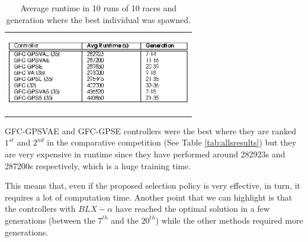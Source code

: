 \documentclass[10pt,journal,compsoc]{IEEEtran}
\begin{document}
\begin{table}[!ht]
	\centering
	{\scriptsize
          \caption{Average runtime in 10 runs of 10 races 
            and
                  generation where the best individual was spawned.}
		\label{tab:time}
				\begin{tabular}{c}
			\includegraphics[width=8cm, height=3.5cm, clip=true, trim=0cm 0cm 0cm 0cm]{fig/table5.eps} 
%					
		
		\end{tabular}
		
	}
\end{table} 
{\sf GFC-GPSVAE and {\sf GFC-GPSE} controllers were the best where
they are ranked $1^{st}$ and $2^{nd}$ in the comparative competition (See Table \ref{tab:allsresults}) but they are very expensive in runtime } since they have performed around 282923s and 287200s respectively, which is a
huge training time. 
           
This means that, even if the proposed selection policy is very effective, in turn, it requires a lot of computation time.
Another point that we can highlight is that the controllers with
$BLX-\alpha$ have reached the optimal solution in a few generations
(between the $7^{th}$ and the $20^{th}$) while the other methods required more
generations. 
\end{document}
